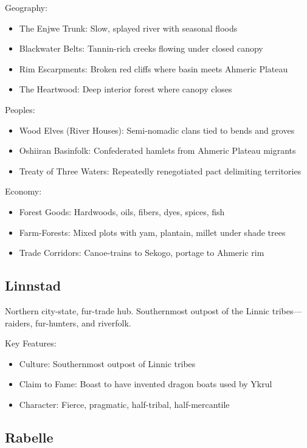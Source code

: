 Geography:
\begin{itemize}
    \item The Enjwe Trunk: Slow, splayed river with seasonal floods
    \item Blackwater Belts: Tannin-rich creeks flowing under closed canopy
    \item Rim Escarpments: Broken red cliffs where basin meets Ahmeric Plateau
    \item The Heartwood: Deep interior forest where canopy closes
\end{itemize}

Peoples:
\begin{itemize}
    \item Wood Elves (River Houses): Semi-nomadic clans tied to bends and groves
    \item Oshiiran Basinfolk: Confederated hamlets from Ahmeric Plateau migrants
    \item Treaty of Three Waters: Repeatedly renegotiated pact delimiting territories
\end{itemize}

Economy:
\begin{itemize}
    \item Forest Goods: Hardwoods, oils, fibers, dyes, spices, fish
    \item Farm-Forests: Mixed plots with yam, plantain, millet under shade trees
    \item Trade Corridors: Canoe-trains to Sekogo, portage to Ahmeric rim
\end{itemize}

\subsection{Linnstad}
\label{sec:linnstad}

Northern city-state, fur-trade hub. Southernmost outpost of the Linnic tribes—raiders, fur-hunters, and riverfolk.

Key Features:
\begin{itemize}
    \item Culture: Southernmost outpost of Linnic tribes
    \item Claim to Fame: Boast to have invented dragon boats used by Ykrul
    \item Character: Fierce, pragmatic, half-tribal, half-mercantile
\end{itemize}

\subsection{Rabelle}
\label{sec:rabelle}

